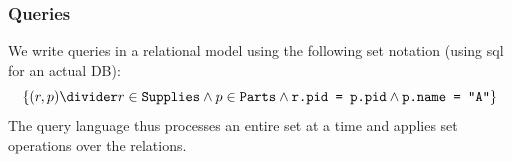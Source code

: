 \subsubsection{Queries}
We write queries in a relational model using the following set notation (using \acrshort{sql} for an actual DB):
\[
    \{ (r, p) \divider r \in \texttt{Supplies} \land p \in \texttt{Parts} \land \texttt{r.pid = p.pid} \land \texttt{p.name = "A"} \}
\]
The query language thus processes an entire set at a time and applies set operations over the relations.
